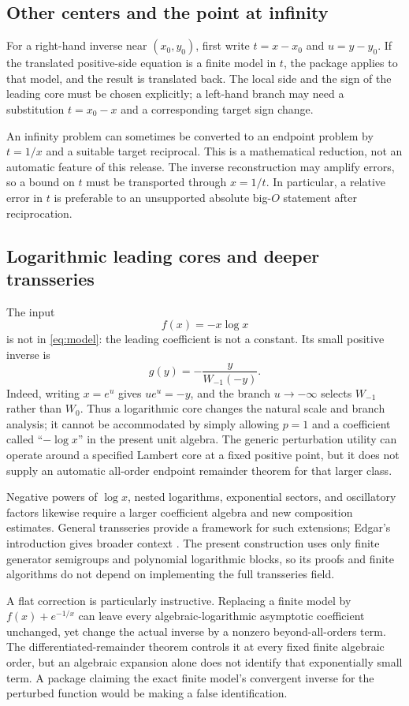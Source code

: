 \documentclass[11pt,a4paper]{article}
\numberwithin{equation}{section}
\theoremstyle{definition}
\begin{document}
\subsection{Other centers and the point at infinity}
For a right-hand inverse near $(x_0,y_0)$, first write
$t=x-x_0$ and $u=y-y_0$. If the translated positive-side equation is a
finite model in $t$, the package applies to that model, and the result
is translated back. The local side and the sign of the leading core
must be chosen explicitly; a left-hand branch may need a substitution
$t=x_0-x$ and a corresponding target sign change.

An infinity problem can sometimes be converted to an endpoint problem
by $t=1/x$ and a suitable target reciprocal. This is a mathematical
reduction, not an automatic feature of this release. The inverse
reconstruction may amplify errors, so a bound on $t$ must be transported
through $x=1/t$. In particular, a relative error in $t$ is preferable to
an unsupported absolute big-$O$ statement after reciprocation.

\subsection{Logarithmic leading cores and deeper transseries}
The input
\[
 f(x)=-x\log x
\]
is not in \eqref{eq:model}: the leading coefficient is not a constant.
Its small positive inverse is
\[
 g(y)=-\frac{y}{W_{-1}(-y)}.
\]
Indeed, writing $x=e^u$ gives $u e^u=-y$, and the branch $u\to-\infty$
selects $W_{-1}$ rather than $W_0$. Thus a logarithmic core changes the
natural scale and branch analysis; it cannot be accommodated by simply
allowing $p=1$ and a coefficient called ``$-\log x$'' in the present
unit algebra. The generic perturbation utility can operate around a
specified Lambert core at a fixed positive point, but it does not supply
an automatic all-order endpoint remainder theorem for that larger class.

Negative powers of $\log x$, nested logarithms, exponential sectors, and
oscillatory factors likewise require a larger coefficient algebra and
new composition estimates. General transseries provide a framework for
such extensions; Edgar's introduction gives broader context
\cite{edgar}. The present construction uses only finite generator
semigroups and polynomial logarithmic blocks, so its proofs and finite
algorithms do not depend on implementing the full transseries field.

A flat correction is particularly instructive. Replacing a finite
model by $f(x)+e^{-1/x}$ can leave every algebraic-logarithmic asymptotic
coefficient unchanged, yet change the actual inverse by a nonzero
beyond-all-orders term. The differentiated-remainder theorem controls
it at every fixed finite algebraic order, but an algebraic expansion
alone does not identify that exponentially small term. A package claiming
the exact finite model's convergent inverse for the perturbed function
would be making a false identification.
\end{document}
